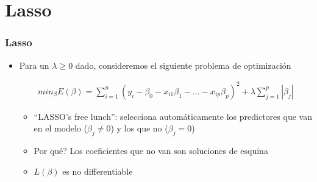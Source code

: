 \documentclass[
  shownotes,
  xcolor={svgnames},
  hyperref={colorlinks,citecolor=DarkBlue,linkcolor=andesred,urlcolor=DarkBlue}
  , aspectratio=169]{beamer}
\begin{document}
\section{Lasso}
\begin{frame}[fragile]
\frametitle{Lasso}

\begin{itemize}
\item Para un $\lambda \geq 0$ dado, consideremos el siguiente problema de optimización


\begin{align}
min_{\beta} E(\beta) = \sum_{i=1}^n (y_i-\beta_0 - x_{i1}\beta_1 - \dots - x_{ip}\beta_p)^2 + \lambda \sum_{j=1}^p |\beta_j| 
\end{align}

\medskip
\pause
  \begin{itemize}
    \item  ``LASSO's free lunch'': selecciona automáticamente los predictores que van en el modelo ($\beta_j \neq 0$) y los que no   ($\beta_j = 0$)
    \medskip
    \item Por qué? Los coeficientes que no van son soluciones de esquina
    \medskip
    \item  $L(\beta)$ es no differentiable
  \end{itemize}
\end{itemize}
\end{frame}
\end{document}

